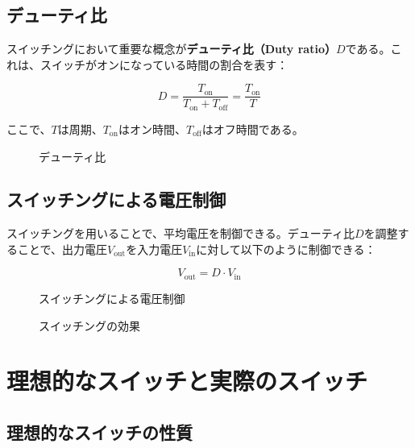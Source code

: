 \subsection{デューティ比}

スイッチングにおいて重要な概念が\textbf{デューティ比（Duty ratio）}$D$である。これは、スイッチがオンになっている時間の割合を表す：

\begin{equation}
D = \frac{T_{\text{on}}}{T_{\text{on}} + T_{\text{off}}} = \frac{T_{\text{on}}}{T}
\end{equation}

ここで、$T$は周期、$T_{\text{on}}$はオン時間、$T_{\text{off}}$はオフ時間である。

\begin{figure}[H]
\centering
{}
\caption{デューティ比}
\label{fig:duty_ratio}
\end{figure}

\subsection{スイッチングによる電圧制御}

スイッチングを用いることで、平均電圧を制御できる。デューティ比$D$を調整することで、出力電圧$V_{\text{out}}$を入力電圧$V_{\text{in}}$に対して以下のように制御できる：

\begin{equation}
V_{\text{out}} = D \cdot V_{\text{in}}
\end{equation}

\begin{figure}[H]
\centering
{}
\caption{スイッチングによる電圧制御}
\label{fig:switching_control}
\end{figure}

\begin{figure}[H]
\centering
{}
\caption{スイッチングの効果}
\label{fig:switching_effect}
\end{figure}

\section{理想的なスイッチと実際のスイッチ}

\subsection{理想的なスイッチの性質}

